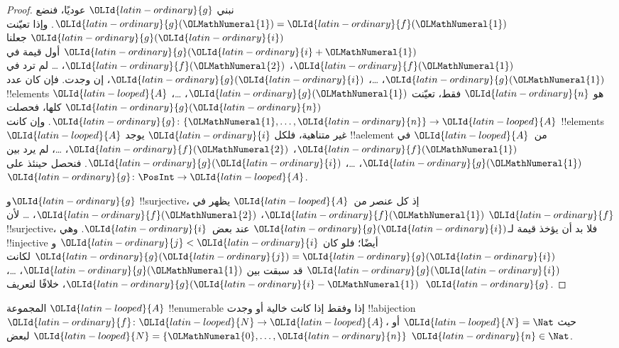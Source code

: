 \documentclass[../../../include/open-logic-section]{subfiles}
\begin{document}
\begin{proof}
نبني ${\OLId{latin-ordinary}{g}}$ عوديًا، فنضع ${\OLId{latin-ordinary}{g}}({\OLMathNumeral{1}}) = {\OLId{latin-ordinary}{f}}({\OLMathNumeral{1}})$. وإذا تعيّنت ${\OLId{latin-ordinary}{g}}({\OLId{latin-ordinary}{i}})$
جعلنا ${\OLId{latin-ordinary}{g}}({\OLId{latin-ordinary}{i}}+{\OLMathNumeral{1}})$ أول قيمة في ${\OLId{latin-ordinary}{f}}({\OLMathNumeral{1}})$، ${\OLId{latin-ordinary}{f}}({\OLMathNumeral{2}})$، \dots{}
لم ترد في ${\OLId{latin-ordinary}{g}}({\OLMathNumeral{1}})$، \dots، ${\OLId{latin-ordinary}{g}}({\OLId{latin-ordinary}{i}})$، إن وجدت.
فإن كان عدد !!{element}s ${\OLId{latin-looped}{A}}$ هو ${\OLId{latin-ordinary}{n}}$ فقط، تعيّنت
${\OLId{latin-ordinary}{g}}({\OLMathNumeral{1}})$، \dots، ${\OLId{latin-ordinary}{g}}({\OLId{latin-ordinary}{n}})$ كلها، فحصلت ${\OLId{latin-ordinary}{g}}\colon \{{\OLMathNumeral{1}}, \dots, {\OLId{latin-ordinary}{n}}\} \to {\OLId{latin-looped}{A}}$.
وإن كانت !!{element}s ${\OLId{latin-looped}{A}}$ غير متناهية، فلكل ${\OLId{latin-ordinary}{i}}$ يوجد !!a{element}
من~${\OLId{latin-looped}{A}}$ في ${\OLId{latin-ordinary}{f}}({\OLMathNumeral{1}})$، ${\OLId{latin-ordinary}{f}}({\OLMathNumeral{2}})$، \dots، لم يرد بين ${\OLId{latin-ordinary}{g}}({\OLMathNumeral{1}})$، \dots، ${\OLId{latin-ordinary}{g}}({\OLId{latin-ordinary}{i}})$.
فنحصل حينئذ على ${\OLId{latin-ordinary}{g}}\colon \PosInt \to {\OLId{latin-looped}{A}}$.

و${\OLId{latin-ordinary}{g}}$ !!{surjective}، إذ كل عنصر من~${\OLId{latin-looped}{A}}$ يظهر في
${\OLId{latin-ordinary}{f}}({\OLMathNumeral{1}})$، ${\OLId{latin-ordinary}{f}}({\OLMathNumeral{2}})$، \dots{} لأن ${\OLId{latin-ordinary}{f}}$ !!{surjective}، فلا بد أن يؤخذ
قيمة لـ${\OLId{latin-ordinary}{g}}({\OLId{latin-ordinary}{i}})$ عند بعض~${\OLId{latin-ordinary}{i}}$. وهي !!{injective} أيضًا؛ فلو كان
${\OLId{latin-ordinary}{j}} < {\OLId{latin-ordinary}{i}}$ و${\OLId{latin-ordinary}{g}}({\OLId{latin-ordinary}{j}}) = {\OLId{latin-ordinary}{g}}({\OLId{latin-ordinary}{i}})$ لكانت ${\OLId{latin-ordinary}{g}}({\OLId{latin-ordinary}{i}})$ قد سبقت بين
${\OLId{latin-ordinary}{g}}({\OLMathNumeral{1}})$، \dots، ${\OLId{latin-ordinary}{g}}({\OLId{latin-ordinary}{i}}-{\OLMathNumeral{1}})$، خلافًا لتعريف~${\OLId{latin-ordinary}{g}}$.
\end{proof}

\begin{cor}
المجموعة ${\OLId{latin-looped}{A}}$ !!{enumerable} إذا وفقط إذا كانت خالية أو وجدت
!!a{bijection} ${\OLId{latin-ordinary}{f}}\colon {\OLId{latin-looped}{N}} \to {\OLId{latin-looped}{A}}$، حيث ${\OLId{latin-looped}{N}} = \Nat$ أو
${\OLId{latin-looped}{N}} = \{{\OLMathNumeral{0}}, \dots, {\OLId{latin-ordinary}{n}}\}$ لبعض ${\OLId{latin-ordinary}{n}} \in \Nat$.
\end{cor}
\end{document}
